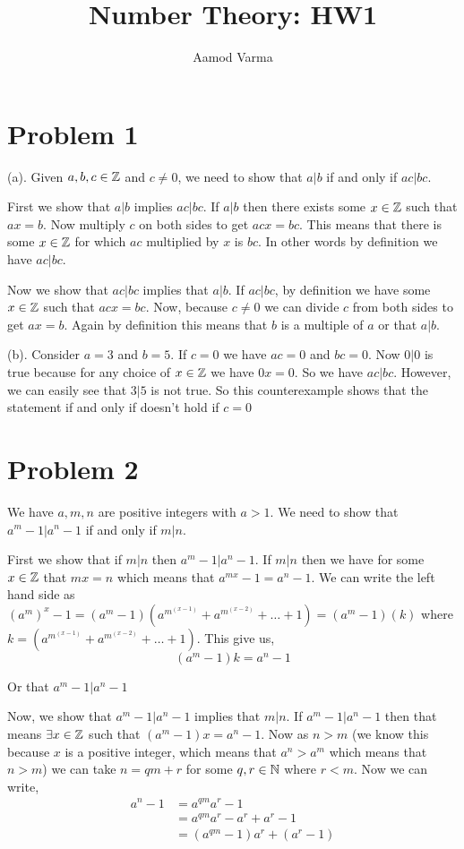 \documentclass[a4paper]{report}
\title{Number Theory: HW1}
\author{Aamod Varma}
\begin{document}
\maketitle
\date{}
    
\section*{Problem 1}

(a). Given $a,b,c \in \mathbb{Z}$ and  $c \ne 0$, we need to show that  $a | b$ if and only if  $ac | bc$.

    First we show that $a | b$ implies  $ac | bc$. If $a | b$ then  there exists some $x \in \mathbb{Z}$ such that  $ax = b$. Now multiply $c$ on both sides to get $acx = bc$. This means that there is some $x \in \mathbb{Z}$ for which  $ac$ multiplied by  $x$ is $bc$. In other words by definition we have  $ac | bc$.


    Now we show that $ac | bc$ implies that  $a | b$. If  $ac | bc$, by definition we have  some $x \in \mathbb{Z}$ such that  $ac x = bc$. Now, because  $c \ne 0$ we can divide  $c$ from both sides to get  $ ax = b$. Again by definition this means that  $b$ is a multiple of  $a$ or that $a | b$.


(b). Consider $a = 3$ and  $b = 5$. If  $c = 0$ we have  $ac = 0 $ and  $bc = 0$. Now  $0 | 0$ is true because for any choice of  $x \in \mathbb{Z}$ we have  $0x = 0$. So we have  $ac | bc$. However, we can easily see that  $3 | 5$ is not true. So this counterexample shows that the statement if and only if doesn't hold if  $c = 0$


\section*{Problem 2}
We have $a, m, n$ are positive integers with  $a > 1$. We need to show that  $a^{m} - 1 | a^{n} - 1$ if and only if $m | n$.


First we show that if $m | n$ then  $a^{m} - 1 | a^{n} - 1$. If $m | n$ then we have for some  $x \in \mathbb{Z}$ that  $mx = n$ which means that  $a^{mx} - 1 = a^{n} - 1$. We can write the left hand side as $(a^{m})^{x} - 1 = (a^{m} - 1)(a^{m}^{(x - 1)}+a^{m}^{(x - 2)}+ \dots+ 1) = (a^{m} - 1)(k)$ where $k = (a^{m}^{(x - 1)}+a^{m}^{(x - 2)}+ \dots+ 1)$. This give us, 
$$ (a^{m} - 1) k = a^{n} - 1 $$ 

Or that $a^{m} - 1 | a^{n} - 1$

Now, we show that  $a^{m} - 1 | a^{n} - 1 $ implies that $m | n$. If $a^{m} - 1 | a^{n} - 1$ then that means $\exists x\in \mathbb{Z}$ such that  $(a^{m} - 1)x = a^{n} - 1$. Now as $n > m$ (we know this because $x$ is a positive integer, which means that $a^{n} > a^{m}$ which means that $n > m$) we can take $n = qm + r$ for some  $q,r \in \mathbb{N}$ where $r < m$. Now we can write, 
\begin{align*}
    a^{n} - 1 &= a^{qm}a^{r}- 1\\
              &= a^{qm}a^{r} - a^{r} + a^{r} - 1\\
              &= (a^{qm} - 1)a^{r}+ (a^{r} - 1)\\
\end{align*}
\end{document}
